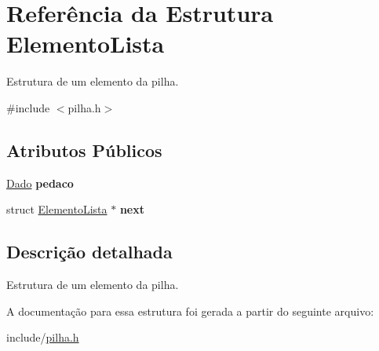 \hypertarget{struct_elemento_lista}{}\section{Referência da Estrutura Elemento\+Lista}
\label{struct_elemento_lista}


Estrutura de um elemento da pilha.  




{\ttfamily \#include $<$pilha.\+h$>$}

\subsection*{Atributos Públicos}
\begin{DoxyCompactItemize}
\item 
\mbox{\label{struct_elemento_lista_aeee1aaec4797ddb33482c04bf722407c}} 
\mbox{\hyperlink{pilha_8h_a5fc4fd986b888c946351fdd1c19309da}{Dado}} {\bfseries pedaco}
\item 
\mbox{\label{struct_elemento_lista_adf0fa82cc81d002350ab358e13b5c10e}} 
struct \mbox{\hyperlink{struct_elemento_lista}{Elemento\+Lista}} $\ast$ {\bfseries next}
\end{DoxyCompactItemize}


\subsection{Descrição detalhada}
Estrutura de um elemento da pilha. 

A documentação para essa estrutura foi gerada a partir do seguinte arquivo\+:\begin{DoxyCompactItemize}
\item 
include/\mbox{\hyperlink{pilha_8h}{pilha.\+h}}\end{DoxyCompactItemize}
